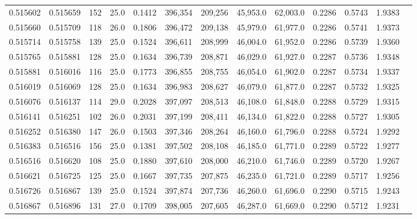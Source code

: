\begin{tabular}{rrrrrrrrrrrrr}
0.515602 & 0.515659 &   152 & 25.0 &                                     0.1412 & 396,354 & 209,256 &  45,953.0 &  62,003.0 & 0.2286 & 0.5743 & 1.9383 \\
0.515660 & 0.515709 &   118 & 26.0 &                                     0.1806 & 396,472 & 209,138 &  45,979.0 &  61,977.0 & 0.2286 & 0.5741 & 1.9373 \\
0.515714 & 0.515758 &   139 & 25.0 &                                     0.1524 & 396,611 & 208,999 &  46,004.0 &  61,952.0 & 0.2286 & 0.5739 & 1.9360 \\
0.515765 & 0.515881 &   128 & 25.0 &                                     0.1634 & 396,739 & 208,871 &  46,029.0 &  61,927.0 & 0.2287 & 0.5736 & 1.9348 \\
0.515881 & 0.516016 &   116 & 25.0 &                                     0.1773 & 396,855 & 208,755 &  46,054.0 &  61,902.0 & 0.2287 & 0.5734 & 1.9337 \\
0.516019 & 0.516069 &   128 & 25.0 &                                     0.1634 & 396,983 & 208,627 &  46,079.0 &  61,877.0 & 0.2287 & 0.5732 & 1.9325 \\
0.516076 & 0.516137 &   114 & 29.0 &                                     0.2028 & 397,097 & 208,513 &  46,108.0 &  61,848.0 & 0.2288 & 0.5729 & 1.9315 \\
0.516141 & 0.516251 &   102 & 26.0 &                                     0.2031 & 397,199 & 208,411 &  46,134.0 &  61,822.0 & 0.2288 & 0.5727 & 1.9305 \\
0.516252 & 0.516380 &   147 & 26.0 &                                     0.1503 & 397,346 & 208,264 &  46,160.0 &  61,796.0 & 0.2288 & 0.5724 & 1.9292 \\
0.516383 & 0.516516 &   156 & 25.0 &                                     0.1381 & 397,502 & 208,108 &  46,185.0 &  61,771.0 & 0.2289 & 0.5722 & 1.9277 \\
0.516516 & 0.516620 &   108 & 25.0 &                                     0.1880 & 397,610 & 208,000 &  46,210.0 &  61,746.0 & 0.2289 & 0.5720 & 1.9267 \\
0.516621 & 0.516725 &   125 & 25.0 &                                     0.1667 & 397,735 & 207,875 &  46,235.0 &  61,721.0 & 0.2289 & 0.5717 & 1.9256 \\
0.516726 & 0.516867 &   139 & 25.0 &                                     0.1524 & 397,874 & 207,736 &  46,260.0 &  61,696.0 & 0.2290 & 0.5715 & 1.9243 \\
0.516867 & 0.516896 &   131 & 27.0 &                                     0.1709 & 398,005 & 207,605 &  46,287.0 &  61,669.0 & 0.2290 & 0.5712 & 1.9231 \\

\end{tabular}
